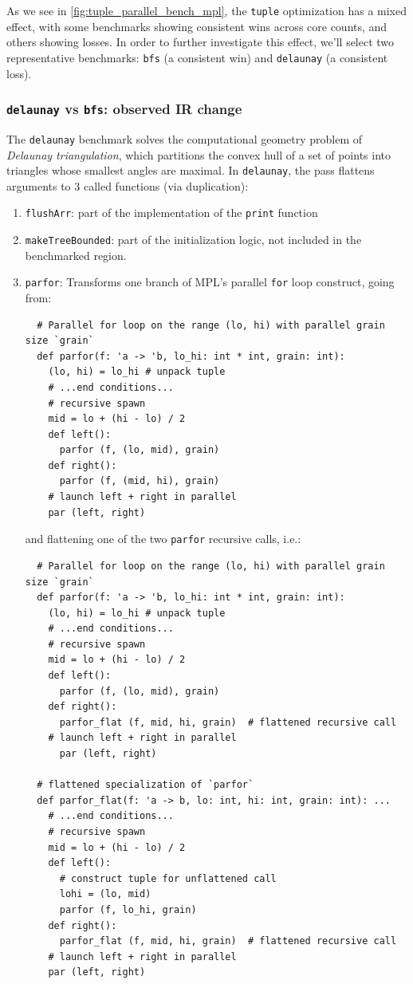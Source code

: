 \documentclass[leqno,11pt]{article}
\begin{document}
As we see in \cref{fig:tuple_parallel_bench_mpl}, the \texttt{tuple}
optimization has a mixed effect, with some benchmarks showing consistent wins
across core counts, and others showing losses. In order to further investigate
this effect, we'll select two representative benchmarks: \texttt{bfs} (a
consistent win) and \texttt{delaunay} (a consistent loss).

\subsubsection{\texttt{delaunay} vs \texttt{bfs}: observed IR change}

The \texttt{delaunay} benchmark solves the computational geometry problem of
\textit{Delaunay triangulation}, which partitions the convex hull of a set of
points into triangles whose smallest angles are maximal. In \texttt{delaunay},
the pass flattens arguments to 3 called functions (via duplication):

\begin{enumerate}
\item \texttt{flushArr}: part of the implementation of the \texttt{print} function
\item \texttt{makeTreeBounded}: part of the initialization logic, not included
  in the benchmarked region.
\item \texttt{parfor}: Transforms one branch of MPL's parallel \texttt{for} loop
  construct, going from:

\begin{verbatim}
  # Parallel for loop on the range (lo, hi) with parallel grain size `grain`
  def parfor(f: 'a -> 'b, lo_hi: int * int, grain: int):
    (lo, hi) = lo_hi # unpack tuple
    # ...end conditions...
    # recursive spawn
    mid = lo + (hi - lo) / 2
    def left():
      parfor (f, (lo, mid), grain)
    def right():
      parfor (f, (mid, hi), grain)
    # launch left + right in parallel
    par (left, right)
\end{verbatim}
and flattening one of the two \texttt{parfor} recursive calls, i.e.:
\begin{verbatim}
  # Parallel for loop on the range (lo, hi) with parallel grain size `grain`
  def parfor(f: 'a -> 'b, lo_hi: int * int, grain: int):
    (lo, hi) = lo_hi # unpack tuple
    # ...end conditions...
    # recursive spawn
    mid = lo + (hi - lo) / 2
    def left():
      parfor (f, (lo, mid), grain)
    def right():
      parfor_flat (f, mid, hi, grain)  # flattened recursive call
    # launch left + right in parallel
      par (left, right)

  # flattened specialization of `parfor`
  def parfor_flat(f: 'a -> b, lo: int, hi: int, grain: int): ...
    # ...end conditions...
    # recursive spawn
    mid = lo + (hi - lo) / 2
    def left():
      # construct tuple for unflattened call
      lohi = (lo, mid)
      parfor (f, lo_hi, grain)
    def right():
      parfor_flat (f, mid, hi, grain)  # flattened recursive call
    # launch left + right in parallel
    par (left, right)
\end{verbatim}
\end{enumerate}
\end{document}
